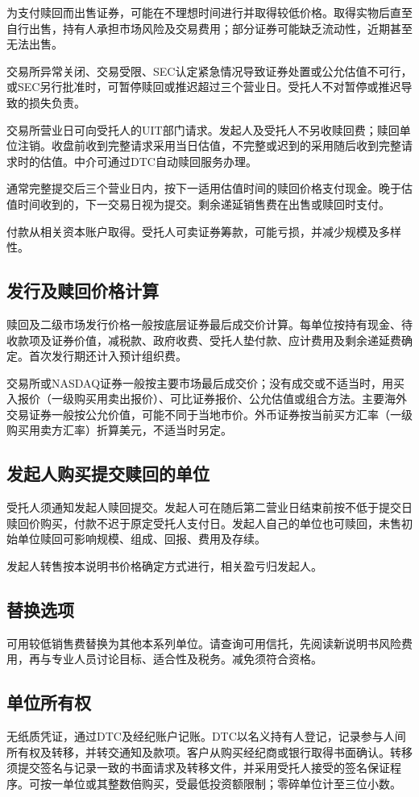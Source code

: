 \documentclass[UTF8,fontset=none,11pt,a4paper]{ctexart}
\begin{document}
为支付赎回而出售证券，可能在不理想时间进行并取得较低价格。取得实物后直至自行出售，持有人承担市场风险及交易费用；部分证券可能缺乏流动性，近期甚至无法出售。


交易所异常关闭、交易受限、SEC认定紧急情况导致证券处置或公允估值不可行，或SEC另行批准时，可暂停赎回或推迟超过三个营业日。受托人不对暂停或推迟导致的损失负责。


交易所营业日可向受托人的UIT部门请求。发起人及受托人不另收赎回费；赎回单位注销。收盘前收到完整请求采用当日估值，不完整或迟到的采用随后收到完整请求时的估值。中介可通过DTC自动赎回服务办理。


通常完整提交后三个营业日内，按下一适用估值时间的赎回价格支付现金。晚于估值时间收到的，下一交易日视为提交。剩余递延销售费在出售或赎回时支付。


付款从相关资本账户取得。受托人可卖证券筹款，可能亏损，并减少规模及多样性。


\subsection*{发行及赎回价格计算}
赎回及二级市场发行价格一般按底层证券最后成交价计算。每单位按持有现金、待收款项及证券价值，减税款、政府收费、受托人垫付款、应计费用及剩余递延费确定。首次发行期还计入预计组织费。


交易所或NASDAQ证券一般按主要市场最后成交价；没有成交或不适当时，用买入报价（一级购买用卖出报价）、可比证券报价、公允估值或组合方法。主要海外交易证券一般按公允价值，可能不同于当地市价。外币证券按当前买方汇率（一级购买用卖方汇率）折算美元，不适当时另定。


\subsection*{发起人购买提交赎回的单位}
受托人须通知发起人赎回提交。发起人可在随后第二营业日结束前按不低于提交日赎回价购买，付款不迟于原定受托人支付日。发起人自己的单位也可赎回，未售初始单位赎回可影响规模、组成、回报、费用及存续。


发起人转售按本说明书价格确定方式进行，相关盈亏归发起人。


\subsection*{替换选项}
可用较低销售费替换为其他本系列单位。请查询可用信托，先阅读新说明书风险费用，再与专业人员讨论目标、适合性及税务。减免须符合资格。


\subsection*{单位所有权}
无纸质凭证，通过DTC及经纪账户记账。DTC以名义持有人登记，记录参与人间所有权及转移，并转交通知及款项。客户从购买经纪商或银行取得书面确认。转移须提交签名与记录一致的书面请求及转移文件，并采用受托人接受的签名保证程序。可按一单位或其整数倍购买，受最低投资额限制；零碎单位计至三位小数。
\end{document}

